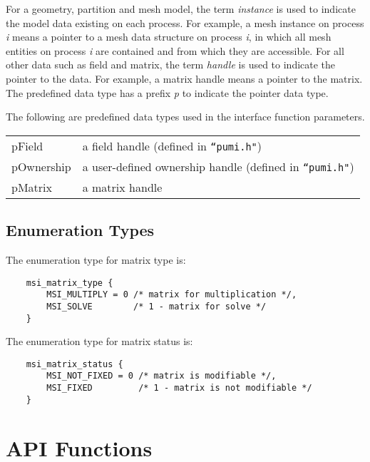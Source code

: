 For a geometry, partition and mesh model, the term \emph{instance} is used to indicate the model data existing on each process. For example, a mesh instance on process \emph{i} means a pointer to a mesh data structure on process \emph{i}, in which all mesh entities on process \emph{i} are contained and from which they are accessible. For all other data such as field and matrix, the term \emph{handle} is used to indicate the pointer to the data. For example, a matrix handle means a pointer to the matrix. The predefined data type has a prefix \emph{p} to indicate the pointer data type.

The following are predefined data types used in the interface function parameters.

\begin{tabular}{lp{14cm}}	
	pField & 	a field handle (defined in \texttt{``pumi.h"})\\
	pOwnership & 	a user-defined ownership handle (defined in \texttt{``pumi.h"}) \\
 	pMatrix &	a matrix handle \\
\end{tabular}	

\subsection{Enumeration Types}

The enumeration type for matrix type is:

\begin{verbatim}
    msi_matrix_type {
        MSI_MULTIPLY = 0 /* matrix for multiplication */,
        MSI_SOLVE      	 /* 1 - matrix for solve */
    }
\end{verbatim}\vspace{-1cm}\hspace{1cm}

The enumeration type for matrix status is:

\begin{verbatim}
    msi_matrix_status {
        MSI_NOT_FIXED = 0 /* matrix is modifiable */,
        MSI_FIXED         /* 1 - matrix is not modifiable */
    }
\end{verbatim}\vspace{-1cm}\hspace{1cm}

\section{API Functions}

